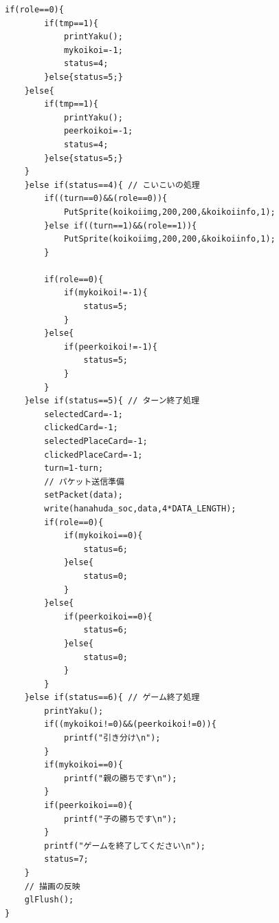 \documentclass[a4j]{jarticle}
\begin{document}
\begin{lstlisting}[basicstyle=\ttfamily\footnotesize, frame=single,label=display,caption=Display関数]
    if(role==0){
        if(tmp==1){
            printYaku();
            mykoikoi=-1;
            status=4;
        }else{status=5;}   
    }else{
        if(tmp==1){
            printYaku();
            peerkoikoi=-1;
            status=4;
        }else{status=5;}
    }
    }else if(status==4){ // こいこいの処理
        if((turn==0)&&(role==0)){
            PutSprite(koikoiimg,200,200,&koikoiinfo,1);
        }else if((turn==1)&&(role==1)){
            PutSprite(koikoiimg,200,200,&koikoiinfo,1);
        }

        if(role==0){
            if(mykoikoi!=-1){
                status=5;
            }
        }else{
            if(peerkoikoi!=-1){ 
                status=5;
            }
        }
    }else if(status==5){ // ターン終了処理
        selectedCard=-1;
        clickedCard=-1;
        selectedPlaceCard=-1;
        clickedPlaceCard=-1;
        turn=1-turn;
        // パケット送信準備
        setPacket(data);
        write(hanahuda_soc,data,4*DATA_LENGTH);
        if(role==0){
            if(mykoikoi==0){
                status=6;
            }else{
                status=0;
            }
        }else{
            if(peerkoikoi==0){
                status=6;
            }else{
                status=0;
            }
        }
    }else if(status==6){ // ゲーム終了処理
        printYaku();
        if((mykoikoi!=0)&&(peerkoikoi!=0)){
            printf("引き分け\n");
        }
        if(mykoikoi==0){
            printf("親の勝ちです\n");
        }
        if(peerkoikoi==0){
            printf("子の勝ちです\n");
        }
        printf("ゲームを終了してください\n");
        status=7;
    }
    // 描画の反映
    glFlush(); 
}
    \end{lstlisting}
\end{document}
